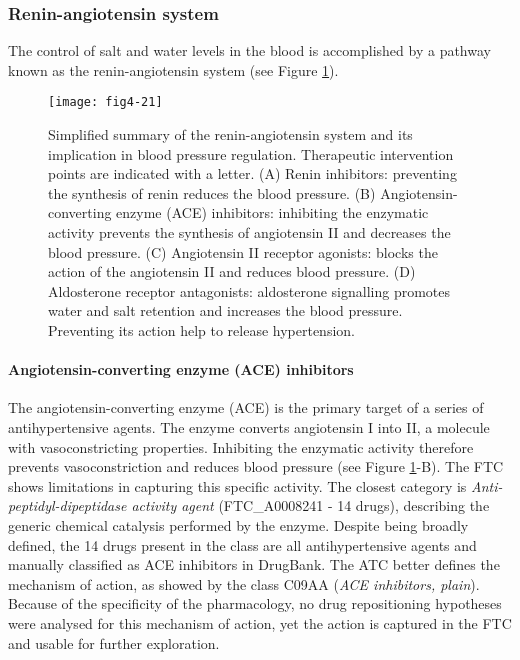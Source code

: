 \subsubsection{Renin-angiotensin system}
The control of salt and water levels in the blood is accomplished by a pathway known as the renin-angiotensin system (see Figure \ref{fig4-21}).

\begin{figure}[H]
    \centering
    \texttt{[image: fig4-21]}
    \caption{Simplified summary of the renin-angiotensin system and its implication in blood pressure regulation. Therapeutic intervention points are indicated with a letter. (A) Renin inhibitors: preventing the synthesis of renin reduces the blood pressure. (B) Angiotensin-converting enzyme (ACE) inhibitors: inhibiting the enzymatic activity prevents the synthesis of angiotensin II and decreases the blood pressure. (C) Angiotensin II receptor agonists: blocks the action of the angiotensin II and reduces blood pressure. (D) Aldosterone receptor antagonists: aldosterone signalling promotes water and salt retention and increases the blood pressure. Preventing its action help to release hypertension.}
    \label{fig4-21}
\end{figure}

\paragraph{\textbf{Angiotensin-converting enzyme (ACE) inhibitors}\\}
The angiotensin-converting enzyme (ACE) is the primary target of a series of antihypertensive agents. The enzyme converts angiotensin I into II, a molecule with vasoconstricting properties. Inhibiting the enzymatic activity therefore prevents vasoconstriction and reduces blood pressure (see Figure \ref{fig4-21}-B).
The FTC shows limitations in capturing this specific activity. The closest category is \emph{Anti-peptidyl-dipeptidase activity agent} (FTC\_A0008241 - 14 drugs), describing the generic chemical catalysis performed by the enzyme. Despite being broadly defined, the 14 drugs present in the class are all antihypertensive agents and manually classified as ACE inhibitors in DrugBank. The ATC better defines the mechanism of action, as showed by the class C09AA (\emph{ACE inhibitors, plain}). Because of the specificity of the pharmacology, no drug repositioning hypotheses were analysed for this mechanism of action, yet the action is captured in the FTC and usable for further exploration.


